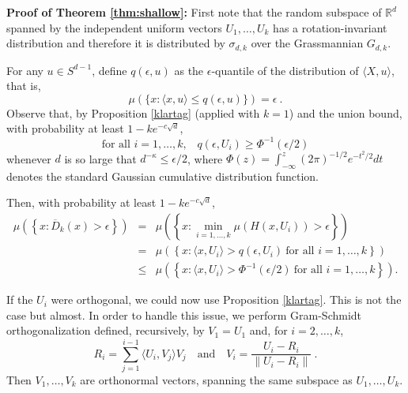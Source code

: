 \documentclass[12pt]{article}
\newcommand{\R}{\mathbb{R}}
\newcommand{\ol}{\overline}
\begin{document}
\medskip
\noindent
{\bf Proof of Theorem \ref{thm:shallow}:}
First note that the random subspace of $\R^d$ spanned by the independent uniform vectors
$U_1,\ldots,U_k$ has a rotation-invariant distribution and therefore it is distributed by $\sigma_{d,k}$
over the Grassmannian $G_{d,k}$.

For any $u\in S^{d-1}$, define $q(\epsilon,u)$ as the 
$\epsilon$-quantile of the distribution of $\langle X,u\rangle$, that is,
\[
  \mu(\{x: \langle x,u\rangle \le q(\epsilon,u) \}) = \epsilon~.
\]
Observe that, by Proposition \ref{klartag} (applied with $k=1$) and the union bound, 
with probability at least $1-ke^{-c\sqrt{d}}$, 
\[
\mbox{for all $i=1,\ldots,k$,} \quad
q(\epsilon,U_i) \ge \Phi^{-1}(\epsilon/2)
\]
whenever $d$ is so large that $d^{-\kappa}\le \epsilon/2$,
where $\Phi(z)= \int_{-\infty}^z (2\pi)^{-1/2} e^{-t^2/2}dt$ denotes the 
standard Gaussian cumulative distribution
function.

Then, with probability at least $1-ke^{-c\sqrt{d}}$, 
\begin{eqnarray*}
\mu\left(\left\{x:\ol{D}_k(x) > \epsilon \right\}\right)
& = & 
\mu\left(\left\{x: \min_{i=1,\ldots,k} \mu(H(x,U_i)) > \epsilon\right\}\right) \\
& = & 
\mu\left(\left\{x: \langle x,U_i\rangle  > q(\epsilon,U_i) \ \mbox{for all $i=1,\ldots,k$}
\right\} \right)
\\
& \le & 
\mu\left(\left\{x: \langle x,U_i \rangle > \Phi^{-1}(\epsilon/2) \ \mbox{for all $i=1,\ldots,k$}\right\} \right).
\end{eqnarray*}


If the $U_i$ were orthogonal, we could now use Proposition \ref{klartag}.
This is not the case but almost. 
In order to handle this issue, we perform Gram-Schmidt orthogonalization
defined, recursively, by $V_1=U_1$
and, for $i=2,\ldots,k$, 
\[
   R_i = \sum_{j=1}^{i-1} \langle U_i,V_j \rangle V_j  \quad \mbox{and} \quad
    V_i = \frac{U_i-R_i}{\|U_i-R_i\|}~.
\]
Then $V_1,\ldots,V_k$ are orthonormal vectors, spanning the same 
subspace as $U_1,\ldots,U_k$.
\end{document}
